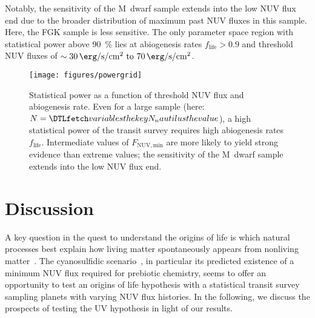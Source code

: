 \documentclass[twocolumn,twocolappendix,linenumbers]{aastex631}
\begin{document}
Notably, the sensitivity of the M~dwarf sample extends into the low \gls{NUV} flux end due to the broader distribution of maximum past \gls{NUV} fluxes in this sample.
Here, the FGK sample is less sensitive.
The only parameter space region with statistical power above \SI{90}{\percent} lies at abiogenesis rates $f_\mathrm{life} > 0.9$ and threshold \gls{NUV} fluxes of $\sim \SIrange{30}{70}{\erg\per\second\per\centi\meter\squared}$.


\begin{figure*}
    \begin{centering}
        \texttt{[image: figures/powergrid]}
        \caption{Statistical power as a function of threshold \gls{NUV} flux and abiogenesis rate. Even for a large sample (here: $N=\var{N_nautilus}$), a high statistical power of the transit survey requires high abiogenesis rates $f_\mathrm{life}$.
         Intermediate values of $F_\mathrm{NUV, min}$ are more likely to yield strong evidence than extreme values; the sensitivity of the M~dwarf sample extends into the low \gls{NUV} flux end.
         }
        \label{fig:powergrid}
    \end{centering}
\end{figure*}



\section{Discussion}
\label{sec:discussion}
A key question in the quest to understand the origins of life is which natural processes best explain how living matter spontaneously appears from nonliving matter~\citep{Malaterre2022}.
The cyanosulfidic scenario~\citep{Patel2015}, in particular its predicted existence of a minimum \gls{NUV} flux required for prebiotic chemistry, seems to offer an opportunity to test an origins of life hypothesis with a statistical transit survey sampling planets with varying \gls{NUV} flux histories.
In the following, we discuss the prospects of testing the UV hypothesis in light of our results.
\end{document}
